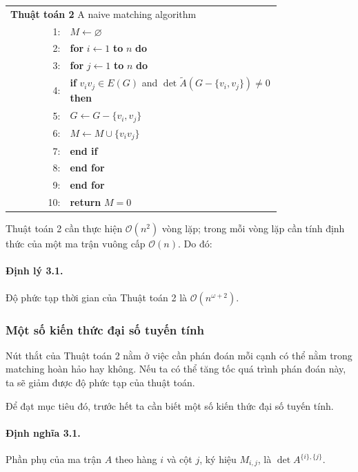 \documentclass[11pt]{article}
\newcommand{\Oh}{\mathcal{O}}
\begin{document}
\begin{center}
\small
\begin{tabular}{r@{\quad}p{0.78\linewidth}}
\multicolumn{2}{l}{\textbf{Thuật toán 2} A naive matching algorithm}\\
1: & \(M\gets\varnothing\)\\
2: & \textbf{for} \(i\gets 1\) \textbf{to} \(n\) \textbf{do}\\
3: & \quad \textbf{for} \(j\gets 1\) \textbf{to} \(n\) \textbf{do}\\
4: & \qquad \textbf{if} \(v_iv_j\in E(G)\) and
      \(\det\tilde A(G-\{v_i,v_j\})\ne 0\) \textbf{then}\\
5: & \qquad\quad \(G\gets G-\{v_i,v_j\}\)\\
6: & \qquad\quad \(M\gets M\cup\{v_iv_j\}\)\\
7: & \qquad \textbf{end if}\\
8: & \quad \textbf{end for}\\
9: & \textbf{end for}\\
10: & \textbf{return} \(M=0\)
\end{tabular}
\end{center}

Thuật toán 2 cần thực hiện \(\Oh(n^2)\) vòng lặp; trong mỗi vòng lặp cần tính
định thức của một ma trận vuông cấp \(\Oh(n)\). Do đó:

\paragraph{Định lý 3.1.}
Độ phức tạp thời gian của Thuật toán 2 là \(\Oh(n^{\omega+2})\).

\subsubsection{Một số kiến thức đại số tuyến tính}

Nút thắt của Thuật toán 2 nằm ở việc cần phán đoán mỗi cạnh có thể nằm trong
matching hoàn hảo hay không. Nếu ta có thể tăng tốc quá trình phán đoán này,
ta sẽ giảm được độ phức tạp của thuật toán.

Để đạt mục tiêu đó, trước hết ta cần biết một số kiến thức đại số tuyến tính.

\paragraph{Định nghĩa 3.1.}
Phần phụ của ma trận \(A\) theo hàng \(i\) và cột \(j\), ký hiệu \(M_{i,j}\),
là \(\det A^{\{i\},\{j\}}\).
\end{document}
